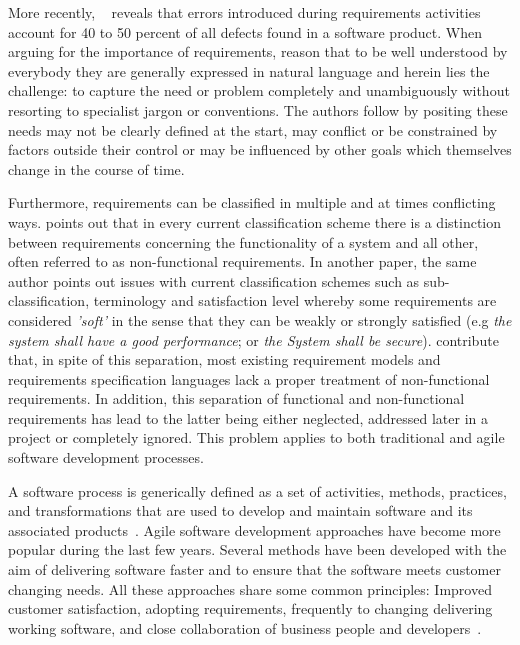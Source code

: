 \documentclass[dissertation,final]{softeng}
\begin{document}
 More recently, ~\citet{Davis200505} reveals that errors introduced during requirements activities account for 40 to 50 percent of all defects found in a software product.  When arguing for the importance of requirements, \citet{Hull2011} reason that to be well understood by everybody they are generally expressed in natural language and herein lies the challenge: to capture the need or problem completely and unambiguously without resorting to specialist jargon or conventions. The authors follow by positing these needs may not be clearly defined at the start, may conflict or be constrained by factors outside their control or may be influenced by other goals which themselves change in the course of time.

Furthermore, requirements can be classified in multiple and at times conflicting ways. \citet{Glinz:2007ehba} points out that in every current classification scheme there is a distinction between requirements concerning the functionality of a system and all other, often referred to as non-functional requirements. In another paper, the same author points out issues with current classification schemes such as sub-classification, terminology and satisfaction level whereby some requirements are considered \emph{'soft'} in the sense that they can be weakly or strongly satisfied (e.g \emph{the system shall have a good performance}; or \emph{the System shall be secure}). \citet{Chung:2009vg} contribute that, in spite of this separation, most existing requirement models and requirements specification languages lack a proper treatment of non-functional requirements. In addition, this separation of functional and non-functional requirements has lead to the latter being either neglected, addressed later in a project or completely ignored. This problem applies to both traditional and agile software development processes. 

A software process is generically defined as a set of activities, methods, practices, and transformations that are used to develop and maintain software and its associated products~\citep{Cugola:1998htba}. Agile software development approaches have become more popular during the last few years. Several methods have been developed with the aim of delivering software faster and to ensure that the software meets customer changing needs. All these approaches share some common principles: Improved customer satisfaction, adopting requirements, frequently to changing delivering working software, and close collaboration of business people and developers~\citep{Paetsch:2003tl}.
\end{document}
